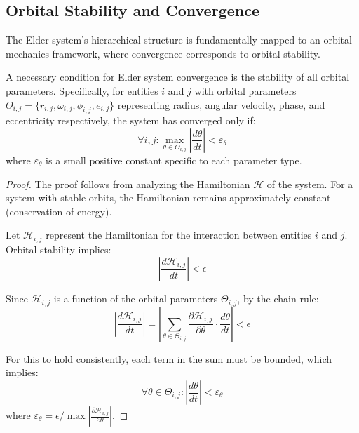 \subsection{Orbital Stability and Convergence}

The Elder system's hierarchical structure is fundamentally mapped to an orbital mechanics framework, where convergence corresponds to orbital stability.

\begin{theorem}
A necessary condition for Elder system convergence is the stability of all orbital parameters. Specifically, for entities $i$ and $j$ with orbital parameters $\Theta_{i,j} = \{r_{i,j}, \omega_{i,j}, \phi_{i,j}, e_{i,j}\}$ representing radius, angular velocity, phase, and eccentricity respectively, the system has converged only if:
\begin{equation}
\forall i,j: \max_{\theta \in \Theta_{i,j}} \left| \frac{d\theta}{dt} \right| < \varepsilon_{\theta}
\end{equation}
where $\varepsilon_{\theta}$ is a small positive constant specific to each parameter type.
\end{theorem}

\begin{proof}
The proof follows from analyzing the Hamiltonian $\mathcal{H}$ of the system. For a system with stable orbits, the Hamiltonian remains approximately constant (conservation of energy). 

Let $\mathcal{H}_{i,j}$ represent the Hamiltonian for the interaction between entities $i$ and $j$. Orbital stability implies:
\begin{equation}
\left|\frac{d\mathcal{H}_{i,j}}{dt}\right| < \epsilon
\end{equation}

Since $\mathcal{H}_{i,j}$ is a function of the orbital parameters $\Theta_{i,j}$, by the chain rule:
\begin{equation}
\left|\frac{d\mathcal{H}_{i,j}}{dt}\right| = \left|\sum_{\theta \in \Theta_{i,j}} \frac{\partial \mathcal{H}_{i,j}}{\partial \theta} \cdot \frac{d\theta}{dt}\right| < \epsilon
\end{equation}

For this to hold consistently, each term in the sum must be bounded, which implies:
\begin{equation}
\forall \theta \in \Theta_{i,j}: \left|\frac{d\theta}{dt}\right| < \varepsilon_{\theta}
\end{equation}
where $\varepsilon_{\theta} = \epsilon / \max\left|\frac{\partial \mathcal{H}_{i,j}}{\partial \theta}\right|$.
\end{proof}

